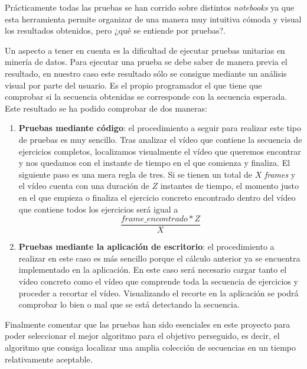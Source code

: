 Prácticamente todas las pruebas se han corrido sobre distintos \textit{notebooks} ya que esta herramienta permite organizar de una manera muy intuitiva cómoda y visual los resultados obtenidos, pero ¿qué se entiende por pruebas?. 

Un aspecto a tener en cuenta es la dificultad de ejecutar pruebas unitarias en minería de datos. Para ejecutar una prueba se debe saber de manera previa el resultado, en nuestro caso este resultado sólo se consigue mediante un análisis visual por parte del usuario. Es el propio programador el que tiene que comprobar si la secuencia obtenidas se corresponde con la secuencia esperada. Este resultado se ha podido comprobar de dos maneras:
\begin{enumerate}
    \item \textbf{Pruebas mediante código}: el procedimiento a seguir para realizar este tipo de pruebas es muy sencillo. Tras analizar el vídeo que contiene la secuencia de ejercicios completos, localizamos visualmente el vídeo que queremos encontrar y nos quedamos con el instante de tiempo en el que comienza y finaliza. El siguiente paso es una mera regla de tres. Si se tienen un total de $X$ \textit{frames} y el vídeo cuenta con una duración de $Z$ instantes de tiempo, el momento justo en el que empieza o finaliza el ejercicio concreto encontrado dentro del vídeo que contiene todos los ejercicios será igual a
    \begin{equation}
        \frac{frame\_encontrado*Z}{X}
    \end{equation}
    \item \textbf{Pruebas mediante la aplicación de escritorio}: el procedimiento a realizar en este caso es más sencillo porque el cálculo anterior ya se encuentra implementado en la aplicación. En este caso será necesario cargar tanto el vídeo concreto como el vídeo que comprende toda la secuencia de ejercicios y proceder a recortar el vídeo. Visualizando el recorte en la aplicación se podrá comprobar lo bien o mal que se está detectando la secuencia.
\end{enumerate}

Finalmente comentar que las pruebas han sido esenciales en este proyecto para poder seleccionar el mejor algoritmo para el objetivo perseguido, es decir, el algoritmo que consiga localizar una amplia colección de secuencias en un tiempo relativamente aceptable. 


 

